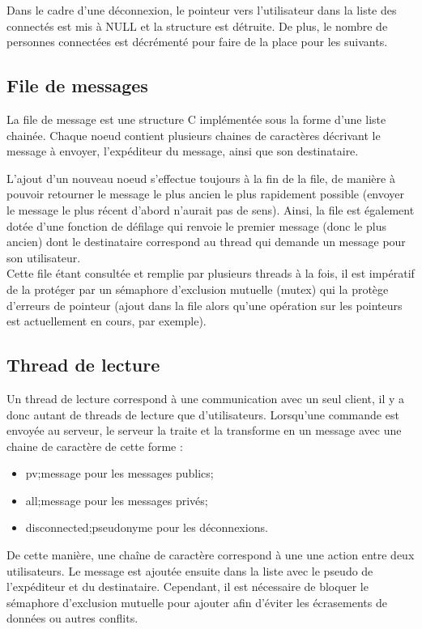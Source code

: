 			Dans le cadre d'une déconnexion, le pointeur vers l'utilisateur dans la liste des connectés est mis à NULL et la structure est détruite. De plus, le nombre de personnes connectées est décrémenté pour faire de la place pour les suivants.
			
		\subsection{File de messages}
			La file de message est une structure C implémentée sous la forme d'une liste chainée. Chaque noeud contient plusieurs chaines de caractères décrivant le message à envoyer, l'expéditeur du message, ainsi que son destinataire.
			
			L'ajout d'un nouveau noeud s'effectue toujours à la fin de la file, de manière à pouvoir retourner le message le plus ancien le plus rapidement possible (envoyer le message le plus récent d'abord n'aurait pas de sens). Ainsi, la file est également dotée d'une fonction de défilage qui renvoie le premier message (donc le plus ancien) dont le destinataire correspond au thread qui demande un message pour son utilisateur.\\
			
			Cette file étant consultée et remplie par plusieurs threads à la fois, il est impératif de la protéger par un sémaphore d'exclusion mutuelle (mutex) qui la protège d'erreurs de pointeur (ajout dans la file alors qu'une opération sur les pointeurs est actuellement en cours, par exemple).
			
		\subsection{Thread de lecture}
			Un thread de lecture correspond à une communication avec un seul client, il y a donc autant de threads de lecture que d'utilisateurs. Lorsqu'une commande est envoyée au serveur, le serveur la traite et la transforme en un message avec une chaine de caractère de cette forme :
			\begin{itemize}
				\item \og pv;message \fg pour les messages publics;
				\item \og all;message \fg pour les messages privés;
				\item \og disconnected;pseudonyme \fg pour les déconnexions.
			\end{itemize}
			
			De cette manière, une chaîne de caractère correspond à une une action entre deux utilisateurs. Le message est ajoutée ensuite dans la liste avec le pseudo de l'expéditeur et du destinataire. Cependant, il est nécessaire de bloquer le sémaphore d'exclusion mutuelle pour ajouter afin d'éviter les écrasements de données ou autres conflits. 
			
